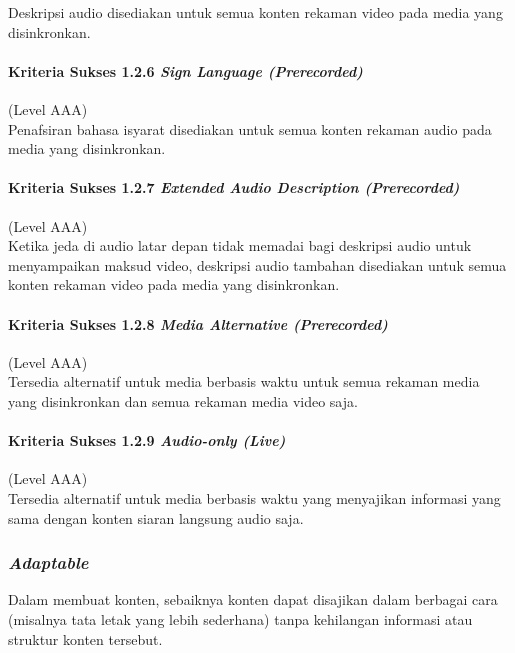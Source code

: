 Deskripsi audio disediakan untuk semua konten rekaman video pada media yang disinkronkan.

\paragraph{Kriteria Sukses 1.2.6 \textit{Sign Language (Prerecorded)}}
\label{sec:kriteria_sukses_1.2.6}
(Level AAA)\\

Penafsiran bahasa isyarat disediakan untuk semua konten rekaman audio pada media yang disinkronkan. 

\paragraph{Kriteria Sukses 1.2.7 \textit{Extended Audio Description (Prerecorded)}}
\label{sec:kriteria_sukses_1.2.7}
(Level AAA)\\

Ketika jeda di audio latar depan tidak memadai bagi deskripsi audio untuk menyampaikan maksud video, deskripsi audio tambahan disediakan untuk semua konten rekaman video pada media yang disinkronkan.

\paragraph{Kriteria Sukses 1.2.8 \textit{Media Alternative (Prerecorded)}}
\label{sec:kriteria_sukses_1.2.8}
(Level AAA)\\

Tersedia alternatif untuk media berbasis waktu untuk semua rekaman media yang disinkronkan dan semua rekaman media video saja.

\paragraph{Kriteria Sukses 1.2.9 \textit{Audio-only (Live)}}
\label{sec:kriteria_sukses_1.2.9}
(Level AAA)\\

Tersedia alternatif untuk media berbasis waktu yang menyajikan informasi yang sama dengan konten siaran langsung audio saja.

\subsubsection{\textit{Adaptable}}
\label{sec:adaptable}
Dalam membuat konten, sebaiknya konten dapat disajikan dalam berbagai cara (misalnya tata letak yang lebih sederhana) tanpa kehilangan informasi atau struktur konten tersebut.

